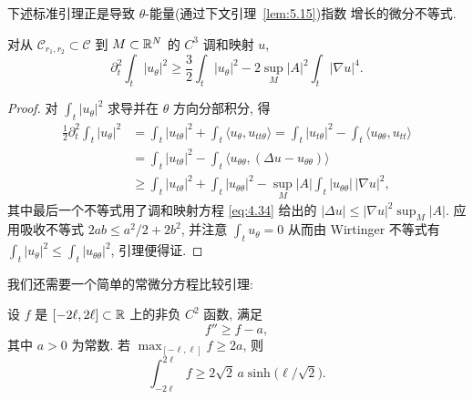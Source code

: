 下述标准引理正是导致 $\theta$-能量(通过下文引理~\ref{lem:5.15})指数
增长的微分不等式.

\begin{lemma}
\label{lem:5.14}
对从 $\mathcal{C}_{r_1,r_2}\subset\mathcal{C}$ 到 $M\subset\mathbb{R}^N$ 的
$C^3$ 调和映射 $u$,
\begin{equation}
\partial_t^2\int_t|u_\theta|^2
\geq\frac32\int_t|u_\theta|^2-2\sup_M|A|^2\int_t|\nabla u|^4.
\label{eq:5.40}
\end{equation}
\end{lemma}

\begin{proof}
对 $\int_t|u_\theta|^2$ 求导并在 $\theta$ 方向分部积分, 得
\begin{equation}
\begin{aligned}
\frac12\partial_t^2\int_t|u_\theta|^2
&=\int_t|u_{t\theta}|^2+\int_t\langle u_\theta,u_{tt\theta}\rangle
 =\int_t|u_{t\theta}|^2-\int_t\langle u_{\theta\theta},u_{tt}\rangle\\
&=\int_t|u_{t\theta}|^2-\int_t\langle u_{\theta\theta},
 (\Delta u-u_{\theta\theta})\rangle\\
&\geq\int_t|u_{t\theta}|^2+\int_t|u_{\theta\theta}|^2
 -\sup_M|A|\int_t|u_{\theta\theta}|\,|\nabla u|^2,
\end{aligned}
\label{eq:5.41}
\end{equation}
其中最后一个不等式用了调和映射方程 \eqref{eq:4.34} 给出的
$|\Delta u|\leq|\nabla u|^2\sup_M|A|$. 应用吸收不等式
$2ab\leq a^2/2+2b^2$, 并注意 $\int_tu_\theta=0$ 从而由 Wirtinger
不等式有 $\int_t|u_\theta|^2\leq\int_t|u_{\theta\theta}|^2$, 引理便得证.
\end{proof}

我们还需要一个简单的常微分方程比较引理:

\begin{lemma}
\label{lem:5.15}
设 $f$ 是 $[-2\ell,2\ell]\subset\mathbb{R}$ 上的非负 $C^2$ 函数, 满足
\begin{equation}
f''\geq f-a,
\label{eq:5.42}
\end{equation}
其中 $a>0$ 为常数. 若 $\max_{[-\ell,\ell]}f\geq 2a$, 则
\begin{equation}
\int_{-2\ell}^{2\ell}f\geq 2\sqrt2\,a\sinh\bigl(\ell/\sqrt2\bigr).
\label{eq:5.43}
\end{equation}
\end{lemma}

